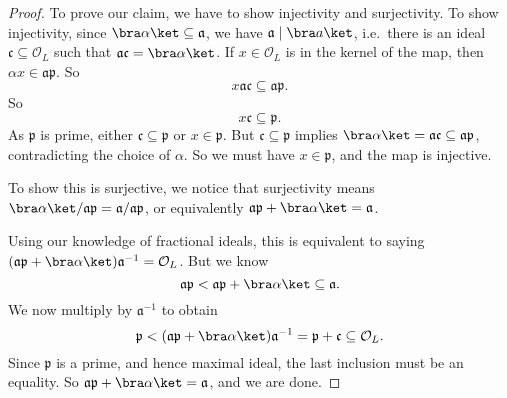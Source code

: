 \documentclass[a4paper]{article}
\begin{document}
\begin{proof}
  To prove our claim, we have to show injectivity and surjectivity. To show injectivity, since $\bra \alpha\ket \subseteq \mathfrak{a}$, we have $\mathfrak{a} \mid \bra a\ket$, i.e.\ there is an ideal $\mathfrak{c} \subseteq \mathcal{O}_L$ such that $\mathfrak{a}\mathfrak{c} = \bra \alpha\ket$. If $x \in \mathcal{O}_L$ is in the kernel of the map, then $\alpha x \in \mathfrak{a}\mathfrak{p}$. So
  \[
    x \mathfrak{a}\mathfrak{c} \subseteq \mathfrak{a}\mathfrak{p}.
  \]
  So
  \[
    x\mathfrak{c} \subseteq \mathfrak{p}.
  \]
  As $\mathfrak{p}$ is prime, either $\mathfrak{c} \subseteq \mathfrak{p}$ or $x \in \mathfrak{p}$. But $\mathfrak{c} \subseteq \mathfrak{p}$ implies $\bra \alpha\ket = \mathfrak{a}\mathfrak{c} \subseteq \mathfrak{a}\mathfrak{p}$, contradicting the choice of $\alpha$. So we must have $x \in \mathfrak{p}$, and the map is injective.

  To show this is surjective, we notice that surjectivity means $\bra \alpha\ket/\mathfrak{a}\mathfrak{p} = \mathfrak{a}/\mathfrak{a}\mathfrak{p}$, or equivalently $\mathfrak{a}\mathfrak{p} + \bra \alpha\ket = \mathfrak{a}$.

  Using our knowledge of fractional ideals, this is equivalent to saying $(\mathfrak{a}\mathfrak{p} + \bra \alpha\ket) \mathfrak{a}^{-1} = \mathcal{O}_L$. But we know
  \[
    \mathfrak{a}\mathfrak{p} < \mathfrak{a}\mathfrak{p} + \bra \alpha\ket \subseteq \mathfrak{a}.
  \]
  We now multiply by $\mathfrak{a}^{-1}$ to obtain
  \[
    \mathfrak{p} < (\mathfrak{a} \mathfrak{p} + \bra \alpha\ket) \mathfrak{a}^{-1} = \mathfrak{p} + \mathfrak{c} \subseteq \mathcal{O}_L.
  \]
  Since $\mathfrak{p}$ is a prime, and hence maximal ideal, the last inclusion must be an equality. So $\mathfrak{a}\mathfrak{p} + \bra\alpha\ket = \mathfrak{a}$, and we are done.
\end{proof}
\end{document}
